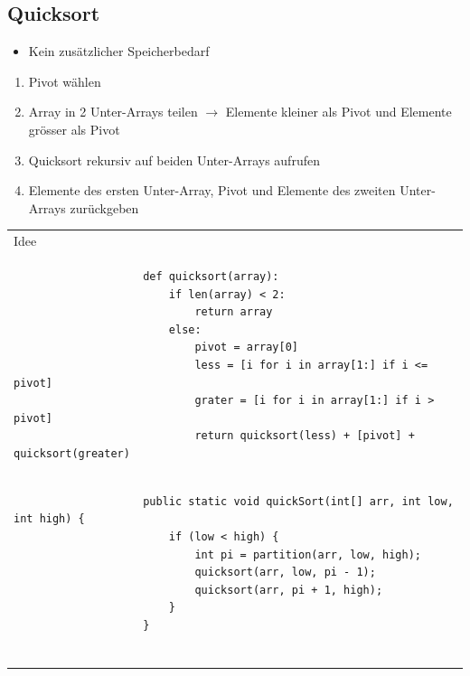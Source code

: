 \documentclass[a4paper, landscape, 8pt]{scrartcl}
\begin{document}
\begin{multicols*}{4}
            \subsection{Quicksort}
                \begin{itemize}
                    \item Kein zusätzlicher Speicherbedarf
                \end{itemize}
                \begin{enumerate}
                    \item Pivot wählen
                    \item Array in 2 Unter-Arrays teilen $\to$ Elemente kleiner als Pivot und Elemente grösser als
                    Pivot
                    \item Quicksort rekursiv auf beiden Unter-Arrays aufrufen
                    \item Elemente des ersten Unter-Array, Pivot und Elemente des zweiten Unter-Arrays zurückgeben
                \end{enumerate}
                \begin{tabular}{|p{6.55cm}|}
                    \hline
                    \textcolor{subsectioncolor}{Idee} \\
                    \begin{lstlisting}
                    def quicksort(array):
                        if len(array) < 2:
                            return array
                        else:
                            pivot = array[0]
                            less = [i for i in array[1:] if i <= pivot]
                            grater = [i for i in array[1:] if i > pivot]
                            return quicksort(less) + [pivot] + quicksort(greater)
                    \end{lstlisting} \\
                    \hline
                    \begin{lstlisting}
                    public static void quickSort(int[] arr, int low, int high) {
                        if (low < high) {
                            int pi = partition(arr, low, high);
                            quicksort(arr, low, pi - 1);
                            quicksort(arr, pi + 1, high);
                        }
                    }


\end{lstlisting}
\end{tabular}
\end{multicols*}
\end{document}
